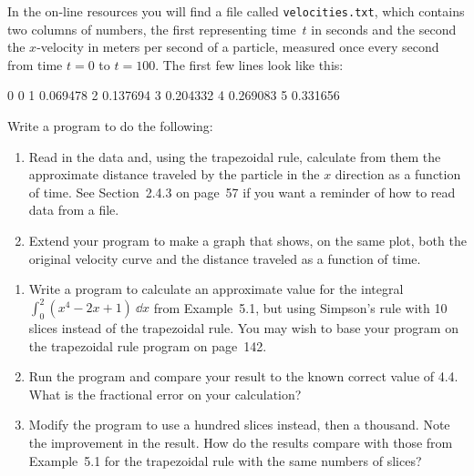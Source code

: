 \documentclass[12pt]{article}
\begin{document}
\par
\bigskip
{}\par
\noindent\hrulefill


\begin{exercises}


\exercise In the on-line resources you will find a file called
\verb|velocities.txt|, which contains two columns of numbers, the first
representing time~$t$ in seconds and the second the $x$-velocity in
 meters per second of a particle, measured once every second from time
$t=0$ to $t=100$.  The first few lines look like this:
\begin{code}
0	0
1	0.069478
2	0.137694
3	0.204332
4	0.269083
5	0.331656
\end{code}
Write a program to do the following:
\begin{enumerate}\setlength{\itemsep}{0pt}
\item Read in the data and, using the trapezoidal rule, calculate from them
  the approximate distance traveled by the particle in the $x$ direction as
  a function of time.  See Section~2.4.3 on page~57 if you want a reminder
  of how to read data from a file.
\item Extend your program to make a graph that shows, on the same plot,
  both the original velocity curve and the distance traveled as a function
  of time.
\end{enumerate}



\exercise
\begin{enumerate}\setlength{\itemsep}{0pt}
\item Write a program to calculate an approximate value for the integral
  $\int_0^2 (x^4 - 2x + 1) \>\dd x$ from Example~5.1, but using Simpson's
  rule with 10 slices instead of the trapezoidal rule.  You may wish to
  base your program on the trapezoidal rule program on
  page~142.
\item Run the program and compare your result to the known correct value of
  4.4.  What is the fractional error on your calculation?
\item Modify the program to use a hundred slices instead, then a thousand.
  Note the improvement in the result.  How do the results compare with
  those from Example~5.1 for the trapezoidal rule with the same numbers of
  slices?
\end{enumerate}



\end{exercises}
\end{document}
